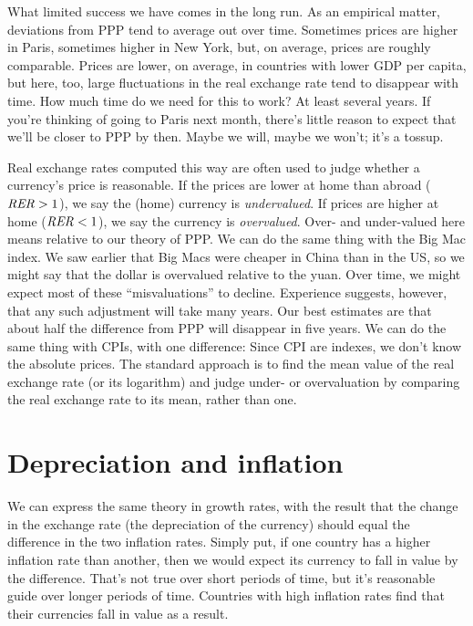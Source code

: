 What limited success we have comes in the long run.
As an empirical matter,
deviations from PPP tend to average out over time.
Sometimes prices are higher in Paris, sometimes higher in New York,
but, on average, prices are roughly comparable.
Prices are lower, on average, in countries with lower GDP per capita, but here, too, large fluctuations in the real exchange rate tend to disappear
with time.
How much time do we need for this to work?
At least several years.
If you're thinking of going to Paris next month,
there's little reason to expect that we'll be closer to PPP by then.
Maybe we will, maybe we won't; it's a tossup.


Real exchange rates computed this way are often used to judge whether
a currency's price is reasonable.
If the prices are lower at home than abroad ($\mbox{\it RER\/} > 1$),
we say the (home) currency is {\it undervalued\/}.
If prices are higher at home ($\mbox{\it RER\/} < 1$),
we say the currency is {\it overvalued\/}.
Over- and under-valued here means relative to our theory of PPP.
We can do the same thing with the Big Mac index.
We saw earlier that Big Macs were cheaper in China than in the US, so we might say that the dollar is overvalued relative to the yuan. Over time, we might expect most of these ``misvaluations'' to decline.
Experience suggests, however, that any such adjustment will take many years.
Our best estimates are that about half the difference from PPP will disappear
in five years. We can do the same thing with CPIs, with one difference: Since CPI are indexes, we don't know the absolute prices. The standard approach is to find the mean value of the real exchange rate
(or its logarithm) and judge under- or overvaluation by comparing the
real exchange rate to its mean, rather than one.


\section{Depreciation and inflation}

We can express the same theory in growth rates,
with the result that the change in the exchange rate
(the depreciation  of the currency)
should equal the difference in the two inflation rates.
Simply put, if one country has a higher inflation rate than another,
then we would expect its currency to fall in value
by the difference.
That's not true over short periods of time,
but it's reasonable guide over longer periods of time.
Countries with high inflation rates find
that their currencies fall in value as a result.

